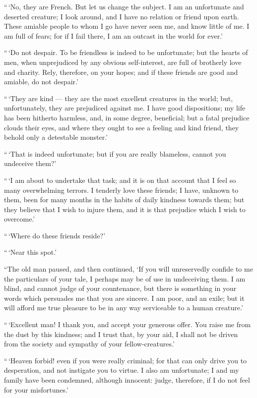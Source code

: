 ``\,`No, they are French. But let us
change the subject. I am an unfortunate
and deserted creature; I look
around, and I have no relation or friend
upon earth. These amiable people to
whom I go have never seen me, and
know little of me. I am full of fears;
for if I fail there, I am an outcast in
the world for ever.'

``\,`Do not despair. To be friendless
is indeed to be unfortunate; but the
hearts of men, when unprejudiced by
any obvious self-interest, are full of brotherly
love and charity. Rely, therefore,
on your hopes; and if these friends
are good and amiable, do not despair.'

``\,`They are kind --- they are the
most excellent creatures in the world;
but, unfortunately, they are prejudiced
against me. I have good dispositions;
my life has been hitherto harmless, and,
in some degree, beneficial; but a fatal
prejudice clouds their eyes, and where
they ought to see a feeling and kind
friend, they behold only a detestable
monster.'

``\,`That is indeed unfortunate; but
if you are really blameless, cannot you
undeceive them?'

``\,`I am about to undertake that
task; and it is on that account that I
feel so many overwhelming terrors. I
tenderly love these friends; I have, unknown
to them, been for many months
in the habits of daily kindness towards
them; but they believe that I wish to
injure them, and it is that prejudice
which I wish to overcome.'

``\,`Where do these friends reside?'

``\,`Near this spot.'

``The old man paused, and then
continued, `If you will unreservedly
confide to me the particulars of your
tale, I perhaps may be of use in undeceiving
them. I am blind, and cannot
judge of your countenance, but
there is something in your words which
persuades me that you are sincere. I
am poor, and an exile; but it will afford
me true pleasure to be in any way serviceable
to a human creature.'

``\,`Excellent man! I thank you, and
accept your generous offer. You raise
me from the dust by this kindness; and
I trust that, by your aid, I shall not be
driven from the society and sympathy
of your fellow-creatures.'

``\,`Heaven forbid! even if you were
really criminal; for that can only drive
you to desperation, and not instigate
you to virtue. I also am unfortunate;
I and my family have been condemned,
although innocent: judge, therefore, if
I do not feel for your misfortunes.'

